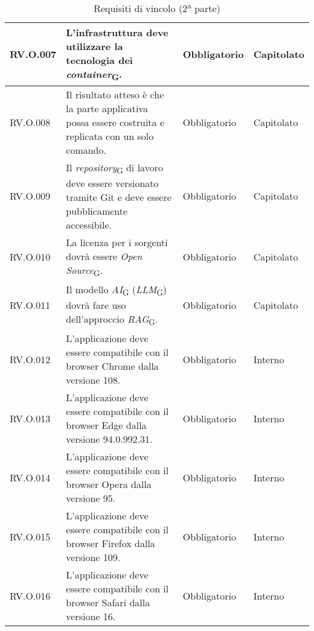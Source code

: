 \begin{table}[H]
\centering
    \begin{tabular}{|C{2.7cm}|L{7.2cm}|C{2.7cm}|C{2cm}|}
        \hline
        RV.O.007 &  L’infrastruttura deve utilizzare la tecnologia dei \textit{container}\textsubscript{G}.
         & Obbligatorio & Capitolato \\
        \hline
         RV.O.008 & Il risultato atteso è che la parte applicativa possa essere costruita e replicata con un solo comando.
         & Obbligatorio & Capitolato \\
        \hline
        RV.O.009 & Il \textit{repository}\textsubscript{G} di lavoro deve essere versionato tramite Git e deve essere pubblicamente accessibile.
         & Obbligatorio & Capitolato \\
        \hline
        RV.O.010 & La licenza per i sorgenti dovrà essere \textit{Open Source}\textsubscript{G}.
         & Obbligatorio & Capitolato \\
        \hline
        RV.O.011 & Il modello \textit{AI}\textsubscript{G} (\textit{LLM}\textsubscript{G}) dovrà fare uso dell’approccio \textit{RAG}\textsubscript{G}.
         & Obbligatorio & Capitolato \\
        \hline
        RV.O.012 & L’applicazione deve essere compatibile con il browser Chrome dalla
        versione 108.
         & Obbligatorio & Interno \\
        \hline
        RV.O.013 & L’applicazione deve essere compatibile con il browser Edge dalla versione 94.0.992.31.
         & Obbligatorio & Interno \\
        \hline
        RV.O.014 & L’applicazione deve essere compatibile con il browser Opera dalla
        versione 95.
         & Obbligatorio & Interno \\
        \hline
        RV.O.015 & L’applicazione deve essere compatibile con il browser Firefox dalla
versione 109.
         & Obbligatorio & Interno \\
        \hline
        RV.O.016 & L’applicazione deve essere compatibile con il browser Safari dalla
versione 16.
         & Obbligatorio & Interno \\
        \hline
    \end{tabular}
    \caption{Requisiti di vincolo (2\textsuperscript{a}  parte)}
\end{table}